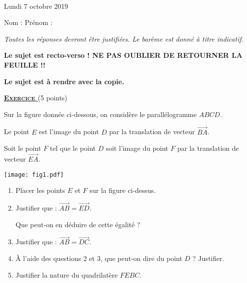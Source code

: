 \documentclass[11pt,a4paper]{article}
\newcounter{nexo}
\newcommand{\exo}{%
\stepcounter{nexo}
{\textbf{\underline{\textsc{Exercice \arabic{nexo}}}}%
\bigskip%
}
}
\begin{document}

\setlength\parindent{0mm}

~\vspace{-1.5cm}

\begin{center} \huge{} \end{center}

\begin{center} \Large{Lundi 7 octobre 2019} \end{center}

\medskip

Nom : \dotfill Prénom : \dotfill

\medskip

\textit{Toutes les réponses devront être justifiées.} \textit{Le barème est donné à titre indicatif.} \par 
\textbf{Le sujet est recto-verso ! NE PAS OUBLIER DE RETOURNER LA FEUILLE !!} \par 
\textbf{Le sujet est à rendre avec la copie.}

\bigskip

\exo \hfill (5 points)

Sur la figure donnée ci-dessous, on considère le parallélogramme $ABCD$. \par 
Le point $E$ est l'image du point $D$ par la translation de vecteur $\overrightarrow{BA}$. \par 
Soit le point $F$ tel que le point $D$ soit l'image du point $F$ par la translation de vecteur $\overrightarrow{EA}$. \par 

\begin{center}
\texttt{[image: fig1.pdf]}
\end{center}

\begin{enumerate}
\item Placer les points $E$ et $F$ sur la figure ci-dessus.
\item Justifier que : $\overrightarrow{AB} = \overrightarrow{ED}$. \par 
Que peut-on en déduire de cette égalité ?
\item Justifier que : $\overrightarrow{AB} = \overrightarrow{DC}$.
\item À l'aide des questions 2 et 3, que peut-on dire du point $D$ ? Justifier.
\item Justifier la nature du quadrilatère $FEBC$.
\end{enumerate}
\end{document}
